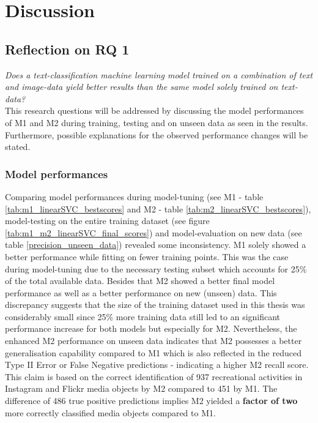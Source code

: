 \chapter{Discussion} \label{discussion}

\section{Reflection on RQ 1}\label{discussion_rq1}

\textit{Does a text-classification machine learning model trained on a combination of text and image-data yield better results than the same model solely trained on text-data?}\\

This research questions will be addressed by discussing the model performances of M1 and M2 during training, testing and on unseen data as seen in the results. Furthermore, possible explanations for the observed performance changes will be stated.

\subsection{Model performances}

Comparing model performances during model-tuning (see M1 - table \ref{tab:m1_linearSVC_bestscores} and M2 - table \ref{tab:m2_linearSVC_bestscores}), model-testing on the entire training dataset (see figure \ref{tab:m1_m2_linearSVC_final_scores}) and model-evaluation on new data (see table \ref{precision_unseen_data}) revealed some inconsistency. M1 solely showed a better performance while fitting on fewer training points. This was the case during model-tuning due to the necessary testing subset which accounts for 25\% of the total available data. Besides that M2 showed a better final model performance as well as a better performance on new (unseen) data. This discrepancy suggests that the size of the training dataset used in this thesis was considerably small since 25\% more training data still led to an significant performance increase for both models but especially for M2. Nevertheless, the enhanced M2 performance on unseen data indicates that M2 possesses a better generalisation capability compared to M1 which is also reflected in the reduced Type II Error or False Negative predictions - indicating a higher M2 recall score. This claim is based on the correct identification of 937 recreational activities in Instagram and Flickr media objects by M2 compared to 451 by M1. The difference of 486 true positive predictions implies M2 yielded a \textbf{factor of two} more correctly classified media objects compared to M1.\\


